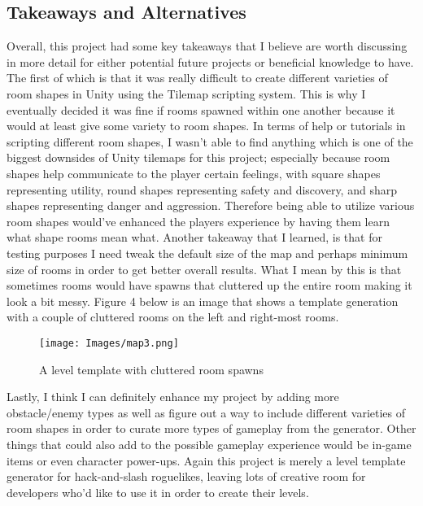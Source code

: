 \documentclass[10pt,twocolumn]{article}
\begin{document}
\subsection{Takeaways and Alternatives}

Overall, this project had some key takeaways that I believe are worth discussing in more detail for either potential future projects or  beneficial knowledge to have. The first of which is that it was really difficult to create different varieties of room shapes in Unity using the Tilemap scripting system. This is why I eventually decided it was fine if rooms spawned within one another because it would at least give some variety to room shapes. In terms of help or tutorials in scripting different room shapes, I wasn't able to find anything which is one of the biggest downsides of Unity tilemaps for this project; especially because room shapes help communicate to the player certain feelings, with square shapes representing utility, round shapes representing safety and discovery, and sharp shapes representing danger and aggression\cite{plowman2023design}. Therefore being able to utilize various room shapes would've enhanced the players experience by having them learn what shape rooms mean what. Another takeaway that I learned, is that for testing purposes I need tweak the default size of the map and perhaps minimum size of rooms in order to get better overall results. What I mean by this is that sometimes rooms would have spawns that cluttered up the entire room making it look a bit messy. Figure 4 below is an image that shows a template generation with a couple of cluttered rooms on the left and right-most rooms. 

\begin{figure}[h]
\centering
\texttt{[image: Images/map3.png]}
\caption{A level template with cluttered room spawns}
\label{fig:x example template 2}
\end{figure}

Lastly, I think I can definitely enhance my project by adding more obstacle/enemy types as well as figure out a way to include different varieties of room shapes in order to curate more types of gameplay from the generator. Other things that could also add to the possible gameplay experience would be in-game items or even character power-ups. Again this project is merely a level template generator for hack-and-slash roguelikes, leaving lots of creative room for developers who'd like to use it in order to create their levels. 
\end{document}
